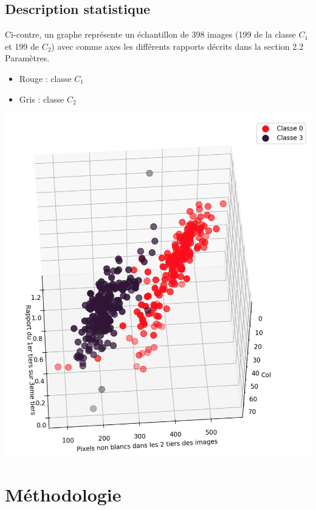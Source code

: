 \documentclass[a4paper,10pt]{article}
\begin{document}
	\subsection{Description statistique}
		\begin{minipage}{0.55\linewidth}
			Ci-contre, un graphe représente un échantillon de 398 images (199 de la classe $C_1$ et 199 de $C_2$) avec comme axes les différents rapports décrits dans la section 2.2 Paramètres.
			\begin{itemize}
				\item Rouge : classe $C_1$
				\item Gris : classe $C_2$
			\end{itemize}
		\end{minipage}\hfill
		\begin{minipage}{0.4\linewidth}
			\includegraphics[scale = 0.2]{fichiers/rapport.PNG}
		\end{minipage}\hfill

\newpage
\section{Méthodologie}
\end{document}
